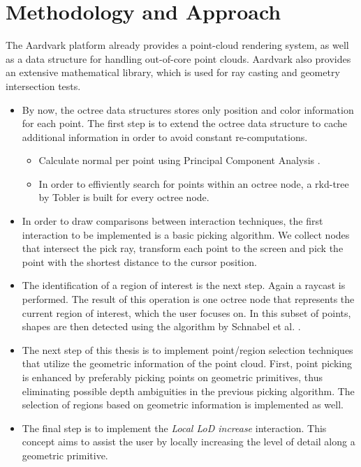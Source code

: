 \section{Methodology and Approach}

The Aardvark platform already provides a point-cloud rendering system, as well as a data structure for handling out-of-core point clouds. Aardvark also provides an extensive mathematical library, which is used for ray casting and geometry intersection tests. 
\\
\begin{itemize}
\item 
By now, the octree data structures stores only position and color information for each point. The first step is to extend the octree data structure to cache additional information in order to avoid constant re-computations. 
\begin{itemize}
	\item Calculate normal per point using Principal Component Analysis \cite{jolliffe2002principal}.
	\item In order to effiviently search for points within an octree node, a	
	rkd-tree by Tobler \cite{tobler2011rkd} is built for every octree node.
\end{itemize}
\item 
In order to draw comparisons between interaction techniques, the first interaction to be implemented is a basic picking algorithm. We collect nodes that intersect the pick ray, transform each point to the screen and pick the point with the shortest distance to the cursor position. 
\item 
The identification of a region of interest is the next step. Again a raycast is performed. The result of this operation is one octree node that represents the current region of interest, which the user focuses on. In this subset of points, shapes are then detected using the algorithm by Schnabel et al. \cite{schnabel-2007-efficient}.
\item
The next step of this thesis is to implement point/region selection techniques that utilize the geometric information of the point cloud. 
First, point picking is enhanced by preferably picking points on geometric primitives, thus eliminating possible depth ambiguities in the previous picking algorithm. 
The selection of regions based on geometric information is implemented as well.
\item
The final step is to implement the \textit{Local LoD increase} interaction. This  concept aims to assist the user by locally increasing the level of detail along a geometric primitive. 

\end{itemize}